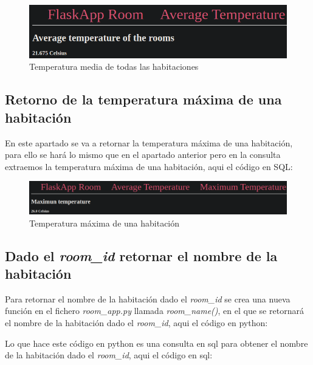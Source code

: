 \documentclass[11pt]{report}
\begin{document}
\begin{figure}[H]
  \centering
  \includegraphics[scale=0.45]{img/average_temperature.png}
  \caption{Temperatura media de todas las habitaciones}
\end{figure}

\subsection{Retorno de la temperatura máxima de una habitación}
En este apartado se va a retornar la temperatura máxima de una habitación, para ello se hará lo mismo que en el apartado
anterior pero en la consulta extraemos la temperatura máxima de una habitación, aqui el código en SQL:
\lstset{style=mystyle}


\begin{figure}[H]
  \centering
  \includegraphics[scale=0.35]{img/maximum_temperature.png}
  \caption{Temperatura máxima de una habitación}
\end{figure}

\cleardoublepage

\subsection{Dado el \emph{room\_id} retornar el nombre de la habitación}
Para retornar el nombre de la habitación dado el \emph{room\_id} se crea una nueva función en el fichero \emph{room\_app.py}
llamada \emph{room\_name()}, en el que se retornará el nombre de la habitación dado el \emph{room\_id}, aqui el código
en python:
\lstset{style=mystyle}


Lo que hace este código en python es una consulta en sql para obtener el nombre de la habitación dado el \emph{room\_id},
aqui el código en sql:
\lstset{style=mystyle}

\end{document}
